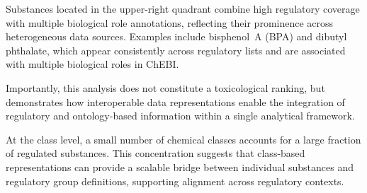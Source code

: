 Substances located in the upper-right quadrant combine high regulatory 
coverage with multiple biological role annotations, reflecting their 
prominence across heterogeneous data sources. 
Examples include bisphenol~A (BPA) and dibutyl phthalate, which appear 
consistently across regulatory lists and are associated with multiple 
biological roles in ChEBI.

Importantly, this analysis does not constitute a toxicological ranking, 
but demonstrates how interoperable data representations enable the 
integration of regulatory and ontology-based information within a 
single analytical framework.

At the class level, a small number of chemical classes accounts for 
a large fraction of regulated substances. This concentration suggests 
that class-based representations can provide a scalable bridge between 
individual substances and regulatory group definitions, supporting 
alignment across regulatory contexts.




